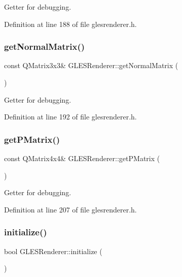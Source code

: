 Getter for debugging. 

Definition at line 188 of file glesrenderer.\+h.

\mbox{\label{class_g_l_e_s_renderer_a0dfc680c7a7b2aea8439f88a892858fe}} 
\subsubsection{\texorpdfstring{getNormalMatrix()}{getNormalMatrix()}}
{\footnotesize\ttfamily const Q\+Matrix3x3\& G\+L\+E\+S\+Renderer\+::get\+Normal\+Matrix (\begin{DoxyParamCaption}{ }\end{DoxyParamCaption})\hspace{0.3cm}{\ttfamily [inline]}}

Getter for debugging. 

Definition at line 192 of file glesrenderer.\+h.

\mbox{\label{class_g_l_e_s_renderer_a57700c29516d33449e65e7243eaf2aac}} 
\subsubsection{\texorpdfstring{getPMatrix()}{getPMatrix()}}
{\footnotesize\ttfamily const Q\+Matrix4x4\& G\+L\+E\+S\+Renderer\+::get\+P\+Matrix (\begin{DoxyParamCaption}{ }\end{DoxyParamCaption})\hspace{0.3cm}{\ttfamily [inline]}}

Getter for debugging. 

Definition at line 207 of file glesrenderer.\+h.

\mbox{\label{class_g_l_e_s_renderer_a0bb1617bc39236ccbf430cd282f127f2}} 
\subsubsection{\texorpdfstring{initialize()}{initialize()}}
{\footnotesize\ttfamily bool G\+L\+E\+S\+Renderer\+::initialize (\begin{DoxyParamCaption}{ }\end{DoxyParamCaption})\hspace{0.3cm}{\ttfamily [virtual]}}

